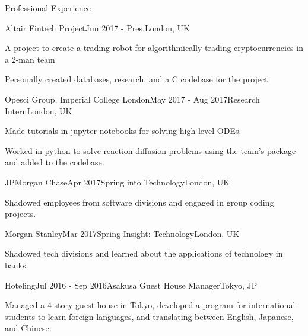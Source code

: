 \documentclass[10pt]{resume} %
\begin{document}
\begin{rSection}{Professional Experience}

\begin{rSubsection}{Altair Fintech Project}{Jun 2017 - Pres.}{}{London, UK}
    \item A project to create a trading robot for algorithmically trading cryptocurrencies in a 2-man team
    \item Personally created databases, research, and a C codebase for the project
\end{rSubsection}


\begin{rSubsection}{Opesci Group, Imperial College London}{May 2017 - Aug 2017}{Research Intern}{London, UK}
    \item Made tutorials in jupyter notebooks for solving high-level ODEs.
    \item Worked in python to solve reaction diffusion problems using the team's package and added to the codebase.
\end{rSubsection}


\begin{rSubsection}{JPMorgan Chase}{Apr 2017}{Spring into Technology}{London, UK}
    \item Shadowed employees from software divisions and engaged in group coding projects.
\end{rSubsection}


\begin{rSubsection}{Morgan Stanley}{Mar 2017}{Spring Insight: Technology}{London, UK}
    \item Shadowed tech divisions and learned about the applications of technology in banks.
\end{rSubsection}


\begin{rSubsection}{Hoteling}{Jul 2016 - Sep 2016}{Asakusa Guest House Manager}{Tokyo, JP}
    \item Managed a 4 story guest house in Tokyo, developed a program for international students to learn foreign languages, and translating between English, Japanese, and Chinese.
\end{rSubsection}


\end{rSection}
\end{document}
